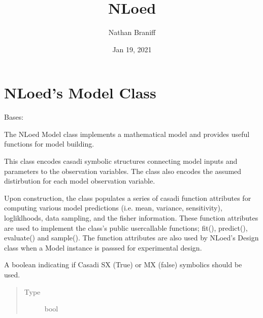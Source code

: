 \documentclass[letterpaper,10pt,english,openany,oneside]{sphinxmanual}
\title{NLoed}
\date{Jan 19, 2021}
\author{Nathan Braniff}
\begin{document}
\pagestyle{empty}
\sphinxmaketitle
\pagestyle{plain}
\sphinxtableofcontents
\pagestyle{normal}
\label{\detokenize{index::doc}}



\chapter{NLoed’s Model Class}
\label{\detokenize{nloed:module-nloed.model}}\label{\detokenize{nloed:nloed-s-model-class}}\label{\detokenize{nloed::doc}}

\begin{fulllineitems}
\label{\detokenize{nloed:nloed.model.Model}}
Bases: 

The NLoed Model class implements a mathematical model and provides useful functions for model building.

This class encodes casadi symbolic structures connecting model inputs and parameters to the
observation variables. The class also encodes the assumed distirbution for each model observation
variable.

Upon construction, the class populates a series of casadi function attributes for
computing various model predictions (i.e. mean, variance, sensitivity), logliklhoods, data
sampling, and the fisher information. These function attributes are used to implement the class’s
public user\sphinxhyphen{}callable functions; fit(), predict(), evaluate() and sample(). The function attributes
are also used by NLoed’s Design class when a Model instance is passsed for experimental design.

\begin{fulllineitems}
\label{\detokenize{nloed:nloed.model.Model.symbolics_boolean}}
A boolean indicating if Casadi SX (True) or MX (false) symbolics
should be used.
\begin{quote}\begin{description}
\item[{Type}] \leavevmode
bool


\end{description}
\end{quote}
\end{fulllineitems}
\end{fulllineitems}
\end{document}

